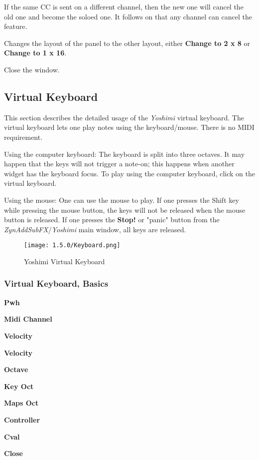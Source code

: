    If the same CC is sent on a different channel, then the new one will cancel the
   old one and become the soloed one. It follows on that any channel can cancel the
   feature.

   Changes the layout of the panel to the other layout, either
   \textbf{Change to 2 x 8} or
   \textbf{Change to 1 x 16}.

   Close the window.

\subsection{Virtual Keyboard}
\label{subsec:virtual_keyboard}

   This section describes the detailed usage of the
   \textsl{Yoshimi} virtual keyboard.
   The virtual keyboard lets one play notes using the keyboard/mouse. There is
   no MIDI requirement.

   Using the computer keyboard: The keyboard is split into three octaves.
   It may happen that the keys will not trigger a note-on;
   this happens when another widget has the keyboard focus.
   To play using the computer keyboard, click on the virtual keyboard.

   Using the mouse: One can use the mouse to play.  If one presses the
   Shift key while pressing the mouse button, the keys will not be released
   when the mouse button is released.  If one presses the \textbf{Stop!} or
   "panic" button from the \textsl{ZynAddSubFX}/\textsl{Yoshimi} main window,
   all keys are released.

\begin{figure}[H]
   \centering
   \texttt{[image: 1.5.0/Keyboard.png]}
   \caption{Yoshimi Virtual Keyboard}
   \label{fig:yoshimi_virtual_keyboard}
\end{figure}

\subsubsection{Virtual Keyboard, Basics}
\label{subsubsec:virtual_keyboard_basics}

   \begin{enumber}
      \item \textbf{Pwh}
      \item \textbf{Midi Channel}
      \item \textbf{Velocity}
      \item \textbf{Velocity}
      \item \textbf{Octave}
      \item \textbf{Key Oct}
      \item \textbf{Maps Oct}
      \item \textbf{Controller}
      \item \textbf{Cval}
      \item \textbf{Close}
   \end{enumber}

